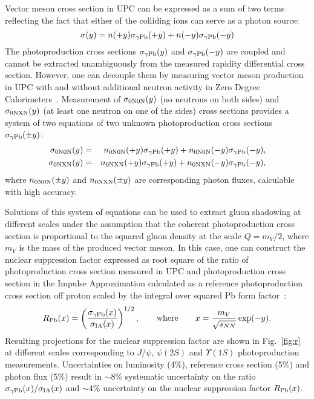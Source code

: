 \documentclass[../report.tex]{subfiles}
\begin{document}
Vector meson cross section in \PbPb UPC can be expressed as a sum of two terms reflecting the fact that either of the colliding ions can serve as a photon source:
\begin{equation}
\sigma(y) = n(+y) \sigma_{\rm \gamma Pb}(+y) + n(-y) \sigma_{\rm \gamma Pb}(-y)
\end{equation}
The photoproduction cross sections $\sigma_{\rm \gamma Pb}(y)$ and $\sigma_{\rm \gamma Pb}(-y)$ are coupled and cannot be extracted unambiguously from the measured rapidity differential cross section. However, one can decouple them by measuring vector meson production in UPC with and without additional neutron activity in Zero Degree Calorimeters~\cite{Guzey:2013jaa}. Measurement of $\sigma_{\rm 0N0N}(y)$ (no neutrons on both sides) and $\sigma_{\rm 0NXN}(y)$ (at least one neutron on one of the sides) cross sections provides a system of two equations of two unknown photoproduction cross sections $\sigma_{\rm \gamma Pb}(\pm y)$:
\begin{eqnarray}
\sigma_{\rm 0N0N}(y) &=& n_{\rm 0N0N}(+y) \sigma_{\rm \gamma Pb}(+y) + n_{\rm 0N0N}(-y) \sigma_{\rm \gamma Pb}(-y), \\
\sigma_{\rm 0NXN}(y) &=& n_{\rm 0NXN}(+y) \sigma_{\rm \gamma Pb}(+y) + n_{\rm 0NXN}(-y) \sigma_{\rm \gamma Pb}(-y),
\end{eqnarray}
where $n_{\rm 0N0N}(\pm y)$ and $n_{\rm 0NXN}(\pm y)$ are corresponding photon fluxes, calculable with high accuracy.

Solutions of this system of equations can be used to extract gluon shadowing at different scales under the assumption that the coherent photoproduction cross section is proportional to the squared gluon density at the scale $Q = m_{V}/2$, where $m_V$ is the mass of the produced vector meson. In this case, one can construct the nuclear suppression factor expressed as root square of the ratio of photoproduction cross section measured in \PbPb UPC and photoproduction cross section in the Impulse Approximation calculated as a reference photoproduction cross section off proton scaled by the integral over squared Pb form factor~\cite{Guzey:2013xba}:
\begin{equation}
R_{\rm Pb} (x) = \left(\frac{\sigma_{\rm \gamma Pb}(x)}{\sigma_{\rm IA}(x)}\right)^{1/2}, \qquad {\rm where}\qquad x  = \frac{m_{V}}{\sqrt{s_{NN}}}\exp(-y).
\end{equation}
Resulting projections for the nuclear suppression factor are shown in Fig.~\ref{fig:r} at different scales corresponding to $J/\psi$, $\psi(2S)$ and $\Upsilon(1S)$ photoproduction measurements. Uncertainties on luminosity (4\%), reference cross section (5\%) and photon flux (5\%) result in $\sim8$\% systematic uncertainty on the ratio $\sigma_{\rm \gamma Pb}(x)/\sigma_{\rm IA}(x)$ and $\sim 4$\% uncertainty on the nuclear suppression factor $R_{\rm Pb} (x)$.
\end{document}
